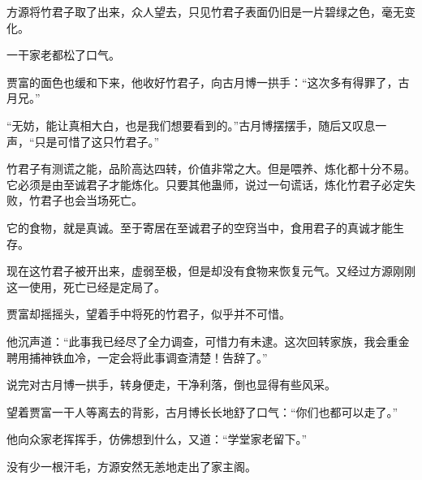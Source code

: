 \begin{this_body}
方源将竹君子取了出来，众人望去，只见竹君子表面仍旧是一片碧绿之色，毫无变化。

一干家老都松了口气。

贾富的面色也缓和下来，他收好竹君子，向古月博一拱手：“这次多有得罪了，古月兄。”

“无妨，能让真相大白，也是我们想要看到的。”古月博摆摆手，随后又叹息一声，“只是可惜了这只竹君子。”

竹君子有测谎之能，品阶高达四转，价值非常之大。但是喂养、炼化都十分不易。它必须是由至诚君子才能炼化。只要其他蛊师，说过一句谎话，炼化竹君子必定失败，竹君子也会当场死亡。

它的食物，就是真诚。至于寄居在至诚君子的空窍当中，食用君子的真诚才能生存。

现在这竹君子被开出来，虚弱至极，但是却没有食物来恢复元气。又经过方源刚刚这一使用，死亡已经是定局了。

贾富却摇摇头，望着手中将死的竹君子，似乎并不可惜。

他沉声道：“此事我已经尽了全力调查，可惜力有未逮。这次回转家族，我会重金聘用捕神铁血冷，一定会将此事调查清楚！告辞了。”

说完对古月博一拱手，转身便走，干净利落，倒也显得有些风采。

望着贾富一干人等离去的背影，古月博长长地舒了口气：“你们也都可以走了。”

他向众家老挥挥手，仿佛想到什么，又道：“学堂家老留下。”

没有少一根汗毛，方源安然无恙地走出了家主阁。

\end{this_body}

